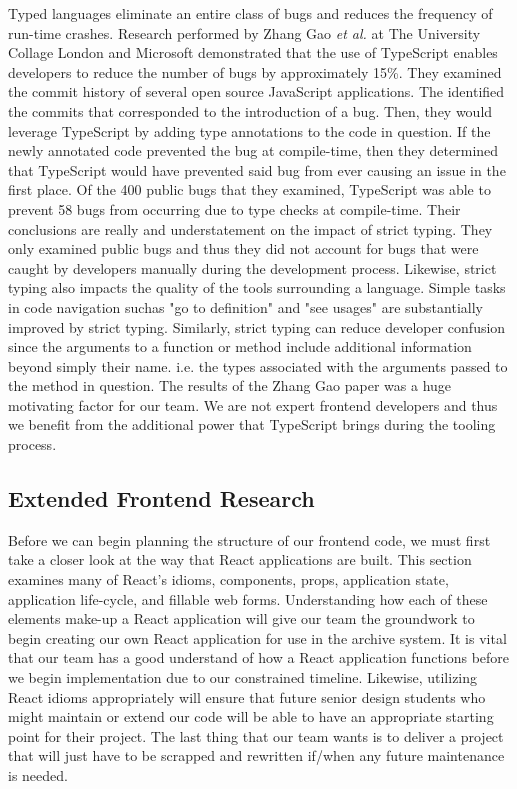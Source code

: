 \documentclass[12pt]{report}
\begin{document}
Typed languages eliminate an entire class of bugs and reduces the frequency of run-time crashes. Research performed by Zhang Gao \textit{et al.} at The University Collage London and Microsoft demonstrated that the use of TypeScript enables developers to reduce the number of bugs by approximately 15\%.\cite{typescriptpaper} They examined the commit history of several open source JavaScript applications. The identified the commits that corresponded to the introduction of a bug. Then, they would leverage TypeScript by adding type annotations to the code in question. If the newly annotated code prevented the bug at compile-time, then they determined that TypeScript would have prevented said bug from ever causing an issue in the first place. Of the 400 public bugs that they examined, TypeScript was able to prevent 58 bugs from occurring due to type checks at compile-time. Their conclusions are really and understatement on the impact of strict typing. They only examined public bugs and thus they did not account for bugs that were caught by developers manually during the development process. Likewise, strict typing also impacts the quality of the tools surrounding a language. Simple tasks in code navigation suchas "go to definition" and "see usages" are substantially improved by strict typing. Similarly, strict typing can reduce developer confusion since the arguments to a function or method include additional information beyond simply their name. i.e. the types associated with the arguments passed to the method in question. The results of the Zhang Gao paper was a huge motivating factor for our team. We are not expert frontend developers and thus we benefit from the additional power that TypeScript brings during the tooling process.

\subsection*{Extended Frontend Research}

Before we can begin planning the structure of our frontend code, we must first take a closer look at the way that React applications are built. This section examines many of React's idioms, components, props, application state, application life-cycle, and fillable web forms. Understanding how each of these elements make-up a React application will give our team the groundwork to begin creating our own React application for use in the archive system. It is vital that our team has a good understand of how a React application functions before we begin implementation due to our constrained timeline. Likewise, utilizing React idioms appropriately will ensure that future senior design students who might maintain or extend our code will be able to have an appropriate starting point for their project. The last thing that our team wants is to deliver a project that will just have to be scrapped and rewritten if/when any future maintenance is needed.
\end{document}
